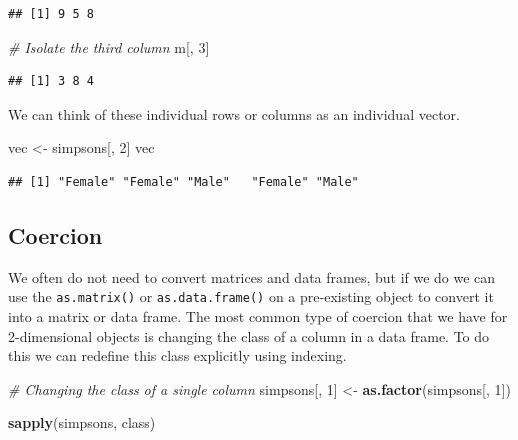 \documentclass[
]{book}
\newenvironment{Shaded}{\begin{snugshade}}{\end{snugshade}}
\newcommand{\CommentTok}[1]{\textcolor[rgb]{0.56,0.35,0.01}{\textit{#1}}}
\newcommand{\DecValTok}[1]{\textcolor[rgb]{0.00,0.00,0.81}{#1}}
\newcommand{\KeywordTok}[1]{\textcolor[rgb]{0.13,0.29,0.53}{\textbf{#1}}}
\newcommand{\NormalTok}[1]{#1}
\newcommand{\StringTok}[1]{\textcolor[rgb]{0.31,0.60,0.02}{#1}}
\begin{document}
\begin{verbatim}
## [1] 9 5 8
\end{verbatim}

\begin{Shaded}
\begin{Highlighting}[]
\CommentTok{# Isolate the third column}
\NormalTok{m[, }\DecValTok{3}\NormalTok{]}
\end{Highlighting}
\end{Shaded}

\begin{verbatim}
## [1] 3 8 4
\end{verbatim}

We can think of these individual rows or columns as an individual vector.

\begin{Shaded}
\begin{Highlighting}[]
\NormalTok{vec <-}\StringTok{ }\NormalTok{simpsons[, }\DecValTok{2}\NormalTok{]}
\NormalTok{vec}
\end{Highlighting}
\end{Shaded}

\begin{verbatim}
## [1] "Female" "Female" "Male"   "Female" "Male"
\end{verbatim}

\hypertarget{coercion-3}{%
\subsection{Coercion}\label{coercion-3}}

We often do not need to convert matrices and data frames, but if we do we can use the \texttt{as.matrix()} or \texttt{as.data.frame()} on a pre-existing object to convert it into a matrix or data frame. The most common type of coercion that we have for 2-dimensional objects is changing the class of a column in a data frame. To do this we can redefine this class explicitly using indexing.

\begin{Shaded}
\begin{Highlighting}[]
\CommentTok{# Changing the class of a single column}
\NormalTok{simpsons[, }\DecValTok{1}\NormalTok{] <-}\StringTok{ }\KeywordTok{as.factor}\NormalTok{(simpsons[, }\DecValTok{1}\NormalTok{])}

\KeywordTok{sapply}\NormalTok{(simpsons, class)}
\end{Highlighting}
\end{Shaded}
\end{document}
